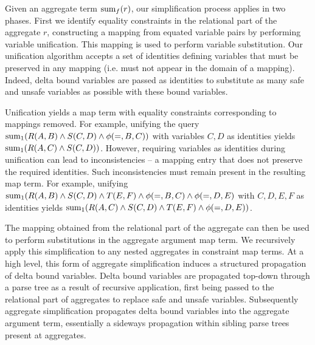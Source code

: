 Given an aggregate term $\mathrm{sum}_{f}(r)$, our simplification process applies in
two phases. First we identify equality constraints in the relational part of the
aggregate $r$, constructing a mapping from equated variable pairs by performing
variable unification. This mapping is used to perform variable substitution. Our
unification algorithm accepts a set of identities defining variables that must
be preserved in any mapping (i.e. must not appear in the domain of a
mapping). Indeed, delta bound variables are passed as identities to substitute
as many safe and unsafe variables as possible with these bound
variables.

Unification yields a map term with equality constraints corresponding
to mappings removed. 
For example, unifying the query
$\mathrm{sum}_{1}(R(A,B) \wedge S(C,D) \wedge \phi(=,B,C))$
with variables $C,D$ as identities yields $\mathrm{sum}_{1}(R(A,C) \wedge S(C,D))$.
However, requiring variables as identities during
unification can lead to inconsistencies -- a mapping entry that does not
preserve the required identities. Such inconsistencies must remain present in
the resulting map term.
For example, unifying
$\mathrm{sum}_{1}(R(A,B) \wedge S(C,D) \wedge T(E,F) \wedge \phi(=,B,C) \wedge
\phi(=,D,E)$ with $C,D,E,F$ as identities yields
 $\mathrm{sum}_{1}(R(A,C) \wedge S(C,D) \wedge T(E,F) \wedge \phi(=,D,E))$.

The mapping obtained from the relational part of the aggregate can then be used
to perform substitutions in the aggregate argument map term. We recursively
apply this simplification to any nested aggregates in constraint map terms.
At a high level, this form of aggregate simplification induces a structured
propagation of delta bound variables. Delta bound variables are propagated
top-down through a parse tree as a result of recursive application, first being
passed to the relational part of aggregates to replace safe and unsafe
variables. Subsequently aggregate simplification propagates delta bound
variables into the aggregate argument term, essentially a sideways propagation
within sibling parse trees present at aggregates.


